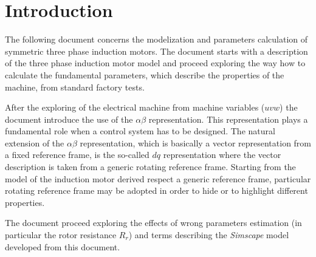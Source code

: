 \documentclass[11pt,a4paper,oneside]{book}
\title{\textbf{ 
		\begin{LARGE}
			Induction Motor
		\end{LARGE} \\[24pt]
		\begin{Large}
			Modelization and Parameters Estimation
	\end{Large}}
}
\author{\textbf{Davide Bagnara}}
\numberwithin{equation}{section}
\theoremstyle{it}
\theoremstyle{definition}
\begin{document}
	\thispagestyle{firstpage}
	\begin{mybox}
		\maketitle
		\vspace{125mm}
	\end{mybox}
	\newpage
	\tableofcontents
	\listoffigures	
	\listoftables
	\newpage

\onehalfspacing
\chapter{Introduction}
The following document concerns the modelization and parameters calculation of symmetric three phase induction motors. The document starts with a description of the three phase induction motor model and proceed exploring the way how to calculate the fundamental parameters, which describe the properties of the machine, from standard factory tests.

After the exploring of the electrical machine from machine variables ($uvw$) the document introduce the use of the $\alpha\beta$ representation. This representation plays a fundamental role when a control system has to be designed. The natural extension of the $\alpha\beta$ representation, which is basically a vector representation from a fixed reference frame, is the so-called $dq$ representation where the vector description is taken from a generic rotating reference frame.  Starting from the model of the induction motor derived respect a generic reference frame, particular rotating reference frame may be adopted in order to hide or to highlight different properties.

The document proceed exploring the effects of wrong parameters estimation (in particular the rotor resistance $R_r$) and terms describing the \textit{Simscape} model developed from this document. 
\end{document}

